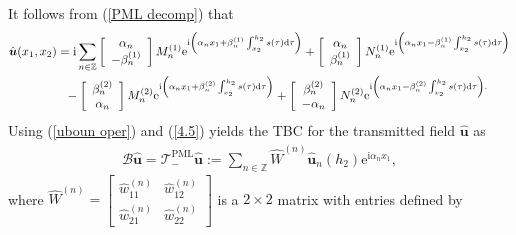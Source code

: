 \documentclass[final,3p,times]{elsarticle}
\begin{document}
It follows from (\ref{PML decomp}) that
\begin{align}\label{4.5}
	\hat{\boldsymbol{u}}(x_1, x_2)&=\mathrm{i} \sum_{n \in \mathbb{Z}}\left[\begin{array}{c}
		\alpha_n \\
		-\beta_n^{(1)}
	\end{array}\right] M_n^{(1)} \mathrm{e}^{\mathrm{i}\left(\alpha_n x_1+\beta_n^{(1)} \int_{x_2}^{h_2} s(\tau) \mathrm{d} \tau\right)}+\left[\begin{array}{c}
		\alpha_n \\
		\beta_n^{(1)}
	\end{array}\right] N_n^{(1)} \mathrm{e}^{\mathrm{i}\left(\alpha_n x_1-\beta_n^{(1)} \int_{x_2}^{h_2} s(\tau) \mathrm{d} \tau\right)} \notag  \\  
	&~~ -{\left[\begin{array}{c}
			\beta_n^{(2)} \\
			\alpha_n
		\end{array}\right] M_n^{(2)} \mathrm{e}^{\mathrm{i}\left(\alpha_n x_1+\beta_n^{(2)} \int_{x_2}^{h_2} s(\tau) \mathrm{d} \tau\right)}+\left[\begin{array}{c}
			\beta_n^{(2)} \\
			-\alpha_n
		\end{array}\right] N_n^{(2)} \mathrm{e}^{\mathrm{i}\left(\alpha_n x_1-\beta_n^{(2)} \int_{x_2}^{h_2} s(\tau) \mathrm{d} \tau\right).}}
\end{align}
Using (\ref{uboun oper}) and (\ref{4.5}) yields the TBC for the transmitted field $\hat{\boldsymbol{u}}$ as
\begin{align}\label{u PML-TBC}
	\mathscr{B} \hat{\boldsymbol{u}}=\mathscr{T}_-^{\mathrm{PML}} \hat{\boldsymbol{u}}:=\sum_{n \in \mathbb{Z}} \hat{W}^{(n)} \hat{\boldsymbol{u}}_{n}(h_2) \mathrm{e}^{\mathrm{i} \alpha_n x_1},
\end{align}
where $\hat{W}^{(n)}=\left[\begin{array}{ll}
	\hat{w}_{11}^{(n)} & \hat{w}_{12}^{(n)} \\
	\hat{w}_{21}^{(n)} & \hat{w}_{22}^{(n)}
\end{array}\right]$ is a $2 \times 2$ matrix with entries defined by 
\end{document}
